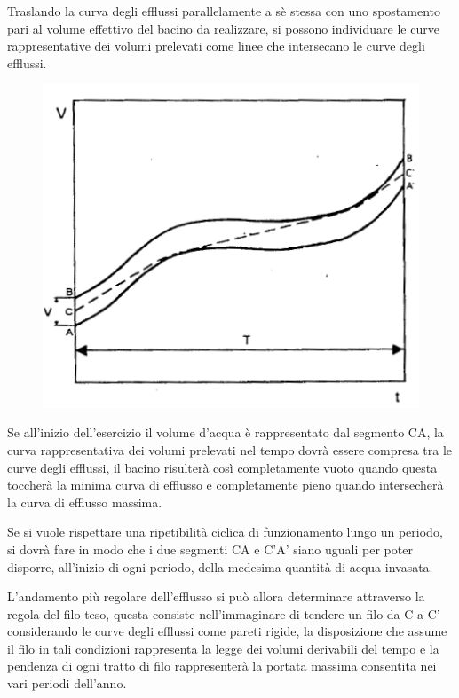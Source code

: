 \documentclass[a4paper, 15pt]{article}
\begin{document}
\begin{adjustwidth}{2in}{}
	Traslando la curva degli efflussi parallelamente a sè stessa con uno spostamento pari al volume effettivo del bacino da realizzare, si possono individuare le curve rappresentative dei volumi prelevati come linee che intersecano le curve degli efflussi. 	
\begin{figure}[H]
	\centering
	\includegraphics[width=0.4\linewidth]{immagini/caputo7}
	\label{fig:caputo7}
\end{figure}
	Se all'inizio dell'esercizio il volume d'acqua è rappresentato dal segmento CA, la curva rappresentativa dei volumi prelevati nel tempo dovrà essere compresa tra le curve degli efflussi, il bacino risulterà così completamente vuoto quando questa toccherà la minima curva di efflusso e completamente pieno quando intersecherà la curva di efflusso massima.
	
	Se si vuole rispettare una ripetibilità ciclica di funzionamento lungo un periodo, si dovrà fare in modo che i due segmenti CA e C'A' siano uguali per poter disporre,  all'inizio di ogni periodo, della medesima quantità di acqua invasata. 
	
	L'andamento più regolare dell'efflusso si può allora determinare attraverso la regola del filo teso, questa consiste nell'immaginare di tendere un filo da C a C' considerando le curve degli efflussi come pareti rigide, la disposizione che assume il filo in tali condizioni rappresenta la legge dei volumi derivabili del tempo e la pendenza di ogni tratto di filo rappresenterà la portata massima consentita nei vari periodi dell'anno. \newline 
	

\end{adjustwidth}
\end{document}
